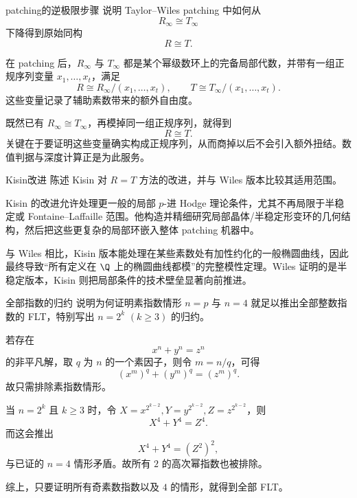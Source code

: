 \begin{problem}{patching的逆极限步骤}
说明 Taylor--Wiles patching 中如何从
\[
R_\infty\cong T_\infty
\]
下降得到原始同构
\[
R\cong T.
\]
\end{problem}
\begin{solution}
在 patching 后，$R_\infty$ 与 $T_\infty$ 都是某个幂级数环上的完备局部代数，并带有一组正规序列变量 $x_1,\dots,x_t$，满足
\[
R\cong R_\infty/(x_1,\dots,x_t),
\qquad
T\cong T_\infty/(x_1,\dots,x_t).
\]
这些变量记录了辅助素数带来的额外自由度。

既然已有 $R_\infty\cong T_\infty$，再模掉同一组正规序列，就得到
\[
R\cong T.
\]
关键在于要证明这些变量确实构成正规序列，从而商掉以后不会引入额外扭结。数值判据与深度计算正是为此服务。
\end{solution}

\begin{problem}{Kisin改进}
陈述 Kisin 对 $R=T$ 方法的改进，并与 Wiles 版本比较其适用范围。
\end{problem}
\begin{solution}
Kisin 的改进允许处理更一般的局部 $p$-进 Hodge 理论条件，尤其不再局限于半稳定或 Fontaine--Laffaille 范围。他构造并精细研究局部晶体/半稳定形变环的几何结构，然后把这些更复杂的局部环嵌入整体 patching 机器中。

与 Wiles 相比，Kisin 版本能处理在某些素数处有加性约化的一般椭圆曲线，因此最终导致“所有定义在 $\Q$ 上的椭圆曲线都模”的完整模性定理。Wiles 证明的是半稳定版本，Kisin 则把局部条件的技术壁垒显著向前推进。
\end{solution}

\begin{problem}{全部指数的归约}
说明为何证明素指数情形 $n=p$ 与 $n=4$ 就足以推出全部整数指数的 FLT，特别写出 $n=2^k$ $(k\ge3)$ 的归约。
\end{problem}
\begin{solution}
若存在
\[
x^n+y^n=z^n
\]
的非平凡解，取 $q$ 为 $n$ 的一个素因子，则令 $m=n/q$，可得
\[
(x^m)^q+(y^m)^q=(z^m)^q.
\]
故只需排除素指数情形。

当 $n=2^k$ 且 $k\ge3$ 时，令 $X=x^{2^{k-2}},Y=y^{2^{k-2}},Z=z^{2^{k-2}}$，则
\[
X^4+Y^4=Z^4.
\]
而这会推出
\[
X^4+Y^4=(Z^2)^2,
\]
与已证的 $n=4$ 情形矛盾。故所有 $2$ 的高次幂指数也被排除。

综上，只要证明所有奇素数指数以及 $4$ 的情形，就得到全部 FLT。
\end{solution}

